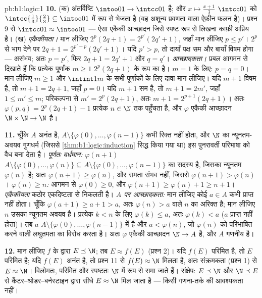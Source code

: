 \begin{solution}{pb:b1:logic:1}
\textbf{10.} (क) अंतर्विष्टि $\intoo01 \to \intcc01$  है; और $x \mapsto
\frac{x + 1}3$ $\intcc01$ को $\intcc{\frac13}{\frac23} \subseteq \intoo01$
में  रूप से भेजता है (वह अशून्य प्रवणता वाला ऐफ़ीन फलन है)। प्रश्न 9 से
$\intcc01 \approx \intoo01$ --- ऐसा एकैकी आच्छादन जिसे स्पष्ट रूप से लिखना
काफ़ी अप्रिय है। (ख) \emph{एकैकीयता।} मान लीजिए $2^p(2q + 1) = 2^{p'}(2q' +
1)$, जहाँ मान लीजिए $p \leq p'$। $2^p$ से भाग देने पर $2q + 1 = 2^{p' -
p}(2q' + 1)$। यदि $p' > p$, तो दायाँ पक्ष सम और बायाँ विषम होगा --- असंभव;
अतः $p = p'$, फिर $2q + 1 = 2q' + 1$ और $q = q'$। \emph{आच्छादकता।} प्रबल
आगमन से दिखाते हैं कि प्रत्येक पूर्णांक $m \geq 1$ $2^p(2q + 1)$ के रूप का
है। $m = 1$ के लिए: $p = q = 0$। मान लीजिए $m \geq 1$ और $\intint1m$ के सभी
पूर्णांकों के लिए दावा मान लीजिए। यदि $m + 1$ विषम है, तो $m + 1 = 2q + 1$,
जहाँ $p = 0$। यदि $m + 1$ सम है, तो $m + 1 = 2m'$, जहाँ $1 \leq m' \leq m$;
परिकल्पना से $m' = 2^p(2q + 1)$, अतः $m + 1 = 2^{p+1}(2q + 1)$। अतः
$\varphi(p, q) = 2^p(2q + 1) - 1$ प्रत्येक $n \in \N$ तक पहुँचता है, और
$\varphi$ एकैकी आच्छादन $\N \times \N \to \N$ है।

\textbf{11.} चूँकि $A$ अनंत है, $A \setminus \{\varphi(0), \dots, \varphi(n
- 1)\}$ कभी रिक्त नहीं होता, और $\N$ का न्यूनतम-अवयव गुणधर्म (जिससे
\cref{thm:b1:logic:induction} सिद्ध किया गया था) इस पुनरावर्ती परिभाषा को
वैध बना देता है। \emph{पूर्णतः वर्धमान:} $\varphi(n + 1)$ $A \setminus
\{\varphi(0), \dots, \varphi(n)\} \subseteq A \setminus \{\varphi(0), \dots,
\varphi(n - 1)\}$ का सदस्य है, जिसका न्यूनतम $\varphi(n)$ है; अतः $\varphi(n
+ 1) \geq \varphi(n)$, और समता संभव नहीं, जिससे $\varphi(n+1) > \varphi(n)$।
\emph{$\varphi(n) \geq n$:} आगमन से $\varphi(0) \geq 0$, और $\varphi(n + 1)
\geq \varphi(n) + 1 \geq n + 1$। \emph{एकैकीयता} कठोर एकदिष्टता से निकलती
है। \emph{$A$ पर आच्छादकता:} मान लीजिए कोई $a \in A$ कभी प्राप्त नहीं होता।
चूँकि $\varphi(a + 1) \geq a + 1 > a$, अतः $\varphi(n) > a$ वाले $n$ का
 अरिक्त है; मान लीजिए $n$ उसका न्यूनतम अवयव है। प्रत्येक $k < n$ के
लिए $\varphi(k) \leq a$, अतः $\varphi(k) < a$ ($a$ प्राप्त नहीं होता)। तब
$a$ $A \setminus \{\varphi(0), \dots, \varphi(n - 1)\}$ में है और $a <
\varphi(n)$, जो $\varphi(n)$ को परिभाषित करने वाली लघुतमता का विरोध करता है।
अतः $\varphi$ एकैकी आच्छादन $\N \to A$ है, और $A$ गणनीय है।

\textbf{12.} मान लीजिए   $f$ के द्वारा $E \preceq \N$; तब $E
\approx f(E)$ (प्रश्न 2)। यदि $f(E)$ परिमित है, तो $E$ परिमित है; यदि $f(E)$
अनंत है, तो प्रश्न 11 से $f(E) \approx \N$ मिलता है, अतः संक्रमकता (प्रश्न
1) से $E \approx \N$। विलोमतः, परिमित  और  स्पष्टतः $\N$
में  रूप से समा जाते हैं। संक्षेप: $E \preceq \N$ और $\N \preceq E$ से
कैंटर--श्रोडर--बर्नस्टाइन द्वारा सीधे $E \approx \N$ मिल जाता है --- किसी
गणना-तर्क की आवश्यकता नहीं।


\end{solution}
